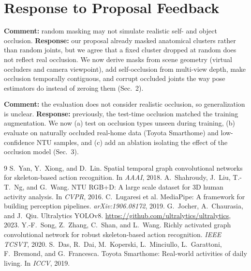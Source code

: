 \documentclass[11pt,twocolumn,letterpaper]{article}
\begin{document}
\section{Response to Proposal Feedback}
\textbf{Comment:} random masking may not simulate realistic self- and object occlusion.
\textbf{Response:} our proposal already masked anatomical clusters rather than random joints,
but we agree that a fixed cluster dropped at random does not reflect real occlusion. We now derive
masks from scene geometry (virtual occluders and camera viewpoint), add self-occlusion from
multi-view depth, make occlusion temporally contiguous, and corrupt occluded joints the way
pose estimators do instead of zeroing them (Sec.~2).

\textbf{Comment:} the evaluation does not consider realistic occlusion, so generalization is unclear.
\textbf{Response:} previously, the test-time occlusion matched the training augmentation.
We now (a) test on occlusion types unseen during training, (b) evaluate on naturally occluded
real-home data (Toyota Smarthome) and low-confidence NTU samples, and (c) add an ablation
isolating the effect of the occlusion model (Sec.~3).

{\small

\begin{thebibliography}{9}
 S.~Yan, Y.~Xiong, and D.~Lin. Spatial temporal graph convolutional networks for skeleton-based action recognition. In \emph{AAAI}, 2018.
 A.~Shahroudy, J.~Liu, T.-T.~Ng, and G.~Wang. NTU RGB+D: A large scale dataset for 3D human activity analysis. In \emph{CVPR}, 2016.
 C.~Lugaresi et al. MediaPipe: A framework for building perception pipelines. \emph{arXiv:1906.08172}, 2019.
 G.~Jocher, A.~Chaurasia, and J.~Qiu. Ultralytics YOLOv8. \url{https://github.com/ultralytics/ultralytics}, 2023.
 Y.-F.~Song, Z.~Zhang, C.~Shan, and L.~Wang. Richly activated graph convolutional network for robust skeleton-based action recognition. \emph{IEEE TCSVT}, 2020.
 S.~Das, R.~Dai, M.~Koperski, L.~Minciullo, L.~Garattoni, F.~Bremond, and G.~Francesca. Toyota Smarthome: Real-world activities of daily living. In \emph{ICCV}, 2019.
\end{thebibliography}
}
\end{document}
